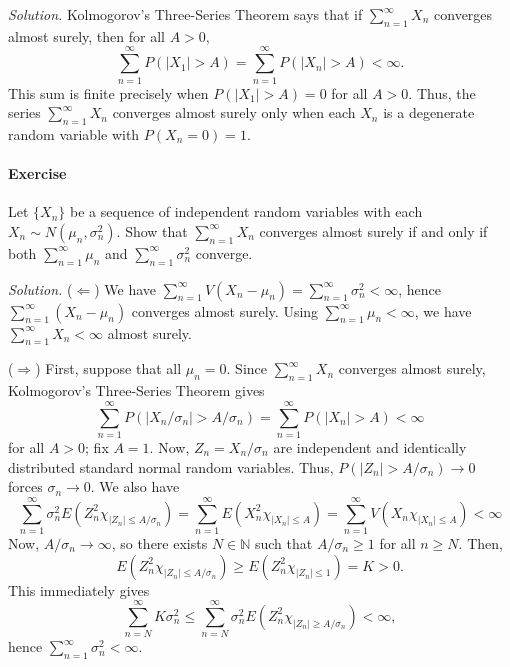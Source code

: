 \documentclass[10pt]{article}
\newcounter{prob}
\newcommand{\problem}{\stepcounter{prob}\paragraph{Exercise \arabic{prob}}}
\newcommand{\solution}{\textit{Solution.} }
\newcommand{\N}{\mathbb{N}}
\begin{document}
    \solution Kolmogorov's Three-Series Theorem says that if $\sum_{n = 1}^\infty
    X_n$ converges almost surely, then for all $A > 0$, \[
        \sum_{n = 1}^\infty P(|X_1| > A) = \sum_{n = 1}^\infty P(|X_n| > A) < \infty.
    \] This sum is finite precisely when $P(|X_1| > A) = 0$ for all $A > 0$. Thus,
    the series $\sum_{n = 1}^\infty X_n$ converges almost surely only when each $X_n$
    is a degenerate random variable with $P(X_n = 0) = 1$.


    \problem Let $\{X_n\}$ be a sequence of independent random variables with each
    $X_n \sim N(\mu_n, \sigma_n^2)$. Show that $\sum_{n = 1}^\infty X_n$ converges
    almost surely if and only if both $\sum_{n = 1}^\infty \mu_n$ and $\sum_{n =
    1}^\infty \sigma_n^2$ converge.

    \solution ($\Longleftarrow$) We have $\sum_{n = 1}^\infty V(X_n - \mu_n) =
    \sum_{n = 1}^\infty \sigma_n^2 < \infty$, hence $\sum_{n = 1}^\infty (X_n -
    \mu_n)$ converges almost surely. Using $\sum_{n = 1}^\infty \mu_n < \infty$, we
    have $\sum_{n = 1}^\infty X_n < \infty$ almost surely.


    ($\Longrightarrow$) First, suppose that all $\mu_n = 0$. Since $\sum_{n =
    1}^\infty X_n$ converges almost surely, Kolmogorov's Three-Series Theorem gives
    \[
        \sum_{n = 1}^\infty P(|X_n/\sigma_n| > A/\sigma_n) = \sum_{n = 1}^\infty
        P(|X_n| > A) < \infty
    \] for all $A > 0$; fix $A = 1$. Now, $Z_n = X_n / \sigma_n$ are independent and
    identically distributed standard normal random variables. Thus, $P(|Z_n| >
    A/\sigma_n) \to 0$ forces $\sigma_n \to 0$. We also have \[
        \sum_{n = 1}^\infty \sigma_n^2E(Z_n^2\chi_{|Z_n| \leq A/\sigma_n}) =
        \sum_{n = 1}^\infty E(X_n^2\chi_{|X_n| \leq A}) =
        \sum_{n = 1}^\infty V(X_n\chi_{|X_n| \leq A}) < \infty
    \] Now, $A/\sigma_n \to \infty$, so there exists $N \in \N$ such that $A/\sigma_n
    \geq 1$ for all $n \geq N$. Then, \[
        E(Z_n^2\chi_{|Z_n| \leq A/\sigma_n}) \geq
        E(Z_n^2\chi_{|Z_n| \leq 1}) = K > 0.
    \] This immediately gives \[
        \sum_{n = N}^\infty K\sigma_n^2 \leq \sum_{n = N}^\infty
        \sigma_n^2 E(Z_n^2\chi_{|Z_n| \geq A/\sigma_n}) < \infty,
    \] hence $\sum_{n = 1}^\infty \sigma_n^2 < \infty$.
\end{document}
